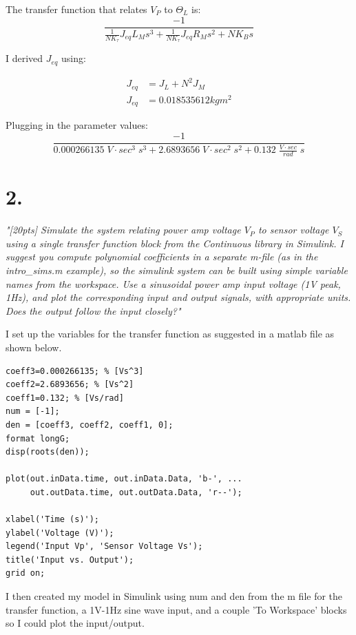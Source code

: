 \documentclass{article}
\begin{document}
The transfer function that relates $V_P$ to $\Theta_L$ is:
\begin{equation}
    \frac{-1}{\frac{1}{NK_{\tau}}J_{eq}L_Ms^3 + \frac{1}{NK_{\tau}}J_{eq}R_Ms^2+NK_Bs}
\end{equation} 

I derived $J_{eq}$ using:

\begin{align*}
    J_{eq} &= J_L + N^2J_M \\
    J_{eq} &= 0.018535612kgm^2
\end{align*}

Plugging in the parameter values:
\begin{equation}
    \frac{-1}{0.000266135\;V\cdot sec^3 \;s^3 + 2.6893656\;V\cdot sec^2\;s^2+0.132\;\frac{V\cdot sec}{rad}\;s}
\end{equation} 

\section*{2.}

\textit{
    "[20pts] Simulate the system relating power amp voltage $V_P$ to sensor voltage $V_S$ using a single
    transfer function block from the Continuous library in Simulink. I suggest you compute
    polynomial coefficients in a separate m-file (as in the intro\_sims.m example), so the simulink
    system can be built using simple variable names from the workspace. Use a sinusoidal power
    amp input voltage (1V peak, 1Hz), and plot the corresponding input and output signals, with
    appropriate units. Does the output follow the input closely?"
}

I set up the variables for the transfer function as suggested in a matlab file as shown below.

\begin{lstlisting}[style=matlabstyle]
coeff3=0.000266135; % [Vs^3]
coeff2=2.6893656; % [Vs^2]
coeff1=0.132; % [Vs/rad]
num = [-1];
den = [coeff3, coeff2, coeff1, 0];
format longG;
disp(roots(den));

plot(out.inData.time, out.inData.Data, 'b-', ...
     out.outData.time, out.outData.Data, 'r--');

xlabel('Time (s)');
ylabel('Voltage (V)');
legend('Input Vp', 'Sensor Voltage Vs');
title('Input vs. Output');
grid on;
\end{lstlisting}

I then created my model in Simulink using num and den from the m file for the transfer function, a 1V-1Hz sine wave input, and a couple 'To Workspace' blocks so I could plot the input/output.
\end{document}
